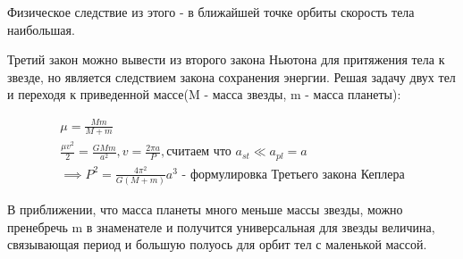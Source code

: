 Физическое следствие из этого - в ближайшей точке орбиты скорость тела наибольшая.

Третий закон можно вывести из второго закона Ньютона для притяжения тела к звезде, но является следствием закона сохранения энергии. Решая задачу двух тел и переходя к приведенной массе(M - масса звезды, m - масса планеты):

\begin{eqnarray}
\mu = \frac{Mm}{M + m}
\label{eq:3_reduced_mass}
\\
\frac{ \mu v^2 }{2} = \frac{GMm}{a^2}, v = \frac{2 \pi a}{P}, \text{считаем что $a_{st} \ll a_{pl} = a$}
\label{eq:3_newton}
\\
\implies P^2 = \frac{4 \pi^2}{G(M + m)} a^3 \text{ - формулировка Третьего закона Кеплера}
\label{eq:3_kepler_third}
\end{eqnarray}

В приближении, что масса планеты много меньше массы звезды, можно пренебречь m в знаменателе и получится универсальная для звезды величина, связывающая период и большую полуось для орбит тел с маленькой массой.

